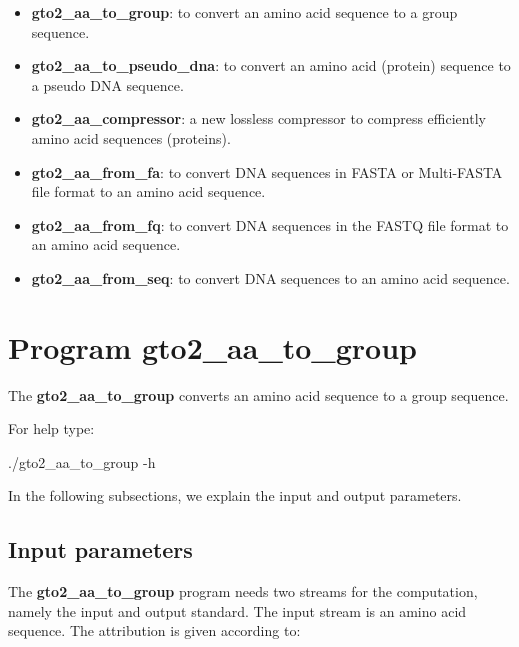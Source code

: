 \documentclass[11pt,]{krantz}
\newenvironment{Shaded}{\begin{snugshade}}{\end{snugshade}}
\newcommand{\ExtensionTok}[1]{#1}
\newcommand{\NormalTok}[1]{#1}
\providecommand{\tightlist}{%
  \setlength{\itemsep}{0pt}\setlength{\parskip}{0pt}}
\begin{document}
\begin{itemize}
\tightlist
\item
  \textbf{gto2\_aa\_to\_group}: to convert an amino acid sequence to a
  group sequence.
\item
  \textbf{gto2\_aa\_to\_pseudo\_dna}: to convert an amino acid (protein)
  sequence to a pseudo DNA sequence.
\item
  \textbf{gto2\_aa\_compressor}: a new lossless compressor to compress
  efficiently amino acid sequences (proteins).
\item
  \textbf{gto2\_aa\_from\_fa}: to convert DNA sequences in FASTA or
  Multi-FASTA file format to an amino acid sequence.
\item
  \textbf{gto2\_aa\_from\_fq}: to convert DNA sequences in the FASTQ
  file format to an amino acid sequence.
\item
  \textbf{gto2\_aa\_from\_seq}: to convert DNA sequences to an amino
  acid sequence.
\end{itemize}

\section{Program gto2\_aa\_to\_group}\label{program-gto2_aa_to_group}

The \textbf{gto2\_aa\_to\_group} converts an amino acid sequence to a
group sequence.

For help type:

\begin{Shaded}
\begin{Highlighting}[]
\ExtensionTok{./gto2_aa_to_group}\NormalTok{ -h}
\end{Highlighting}
\end{Shaded}

In the following subsections, we explain the input and output
parameters.

\subsection*{Input parameters}\label{input-parameters-27}


The \textbf{gto2\_aa\_to\_group} program needs two streams for the
computation, namely the input and output standard. The input stream is
an amino acid sequence. The attribution is given according to:
\end{document}
